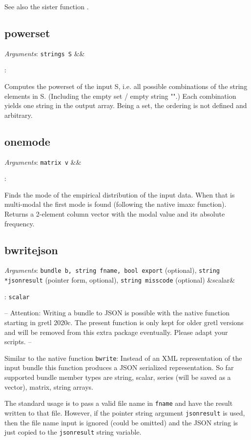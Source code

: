 \documentclass[11pt,english]{article}
\newcommand{\ArgRet}[2]{%
  {\it Arguments}: {#1}%
  \ifx&#2&%
  \else
  \par\smallskip\noindent {\it Return type}: \texttt{#2}
  \fi%
  \par\medskip\par%
  }
\begin{document}
See also the sister function .

\subsection{powerset}

\ArgRet{\texttt{strings S}}{}

Computes the powerset of the input S, i.e. all possible combinations 
of the string elements in S. (Including the empty set / 
empty string "".) Each combination yields one string in the output 
array. Being a set, the ordering is not defined and arbitrary. 


\subsection{onemode}

\ArgRet{\texttt{matrix v}}{}

Finds the mode of the empirical distribution of the input data. 
When that is multi-modal the first mode is found (following the native
imaxc function). Returns a 2-element column vector with the modal 
value and its absolute frequency.

\subsection{bwritejson}

\ArgRet{\texttt{bundle b, string fname, bool export} (optional), 
    \texttt{string *jsonresult} (pointer form, optional), 
    \texttt{string misscode} (optional)}{scalar}

-- Attention: Writing a bundle to JSON is possible with the native function  
starting in gretl 2020c. The present function is only kept for older gretl versions and will be 
removed from this extra package eventually. Please adapt your scripts. --

Similar to the native function \texttt{bwrite}: Instead of an XML representation 
of the input bundle this function produces a JSON serialized representation.
So far supported bundle member types are string, scalar, series (will be saved as a
vector), matrix, string arrays.

The standard usage is to pass a valid file name in \texttt{fname} and have the result 
written to that file. However, if the pointer string argument \texttt{jsonresult} is used, 
then the file name input is ignored (could be omitted) and the JSON string is just 
copied to the \texttt{jsonresult} string variable. 
\end{document}
